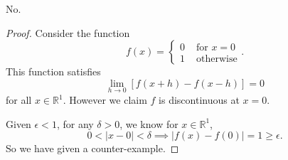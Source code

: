\begin{Exercise}
\begin{answer}
No.
\end{answer}
\begin{proof}
Consider the function
$$
f(x) = \begin{cases}
0 & \mbox{ for } x=0 \\
1 & \mbox{ otherwise}
\end{cases}.
$$
This function satisfies
$$
\lim_{h\to 0}\left[f(x+h)-f(x-h)\right] = 0
$$
for all $x\in\mathbb{R}^1$. However we claim $f$ is discontinuous at $x=0$.

Given $\epsilon < 1$, for any $\delta >0$, we know for $x\in\mathbb{R}^1$, 
$$
0<|x-0|<\delta \implies |f(x)-f(0)| = 1 \geq \epsilon.
$$
So we have given a counter-example.
\end{proof}
\end{Exercise}